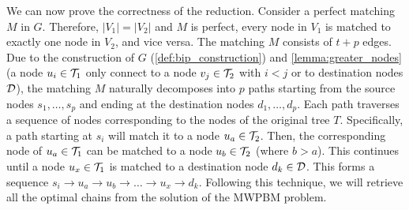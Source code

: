 We can now prove the correctness of the reduction. Consider a perfect matching $M$ in $G$. Therefore, $|V_1|=|V_2|$ and $M$ is perfect, every node in $V_1$ is matched to exactly one node in $V_2$, and vice versa. The matching $M$ consists of $t+p$ edges. Due to the construction of $G$ (\cref{def:bip_construction}) and \cref{lemma:greater_nodes} (a node $u_i \in \mathcal{T}_{1}$ only connect to a node $v_j \in \mathcal{T}_{2}$ with $i < j$ or to destination nodes $\mathcal{D}$), the matching $M$ naturally decomposes into $p$ paths starting from the source nodes $s_1, \dots, s_p$ and ending at the destination nodes $d_1, \dots, d_p$. Each path traverses a sequence of nodes corresponding to the nodes of the original tree $T$.
Specifically, a path starting at $s_i$ will match it to a node $u_{a} \in \mathcal{T}_{2}$. Then, the corresponding node of $u_{a} \in \mathcal{T}_{1}$ can be matched to a node $u_{b} \in \mathcal{T}_{2}$ (where $b > a$). This continues until a node $u_{x} \in \mathcal{T}_{1}$ is matched to a destination node $d_k \in \mathcal{D}$. This forms a sequence $s_i \rightarrow u_{a} \rightarrow u_{b} \rightarrow \dots \rightarrow u_{x} \rightarrow d_k$. Following this technique, we will retrieve all the optimal chains from the solution of the \textsc{MWPBM} problem.

